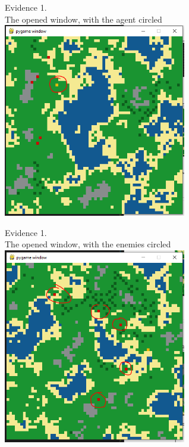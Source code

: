 \begin{flushleft}
\begin{center}
        {\large Evidence 1.\rn } \\ 
        \vspace{0.3cm}
        The opened window, with the agent circled \\
        \includegraphics[width=8cm]{Images/Testing/T1.8.1.PNG} \\
        \vspace{1cm}

        {\large Evidence 1.\rn } \\ 
        \vspace{0.3cm}
        The opened window, with the enemies circled \\
        \includegraphics[width=8cm]{Images/Testing/T1.9.1.PNG} \\
        \vspace{1cm}


\end{center}
\end{flushleft}
